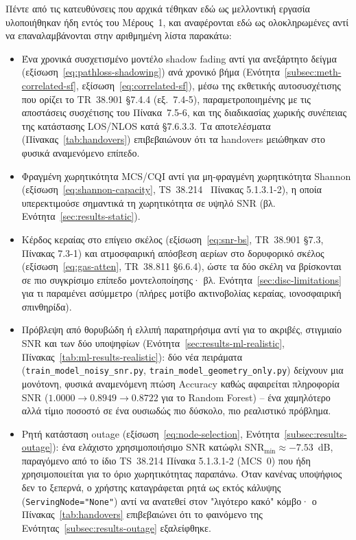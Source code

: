 Πέντε από τις κατευθύνσεις που αρχικά τέθηκαν εδώ ως μελλοντική
εργασία υλοποιήθηκαν ήδη εντός του Μέρους~1, και αναφέρονται εδώ ως
ολοκληρωμένες αντί να επαναλαμβάνονται στην αριθμημένη λίστα παρακάτω:

\begin{itemize}
  \item Ένα χρονικά συσχετισμένο μοντέλο shadow fading αντί για
    ανεξάρτητο δείγμα (εξίσωση~\eqref{eq:pathloss-shadowing}) ανά χρονικό
    βήμα (Ενότητα~\ref{subsec:meth-correlated-sf},
    εξίσωση~\eqref{eq:correlated-sf}), μέσω της εκθετικής αυτοσυσχέτισης
    που ορίζει το TR~38.901 §7.4.4 (εξ.~7.4-5), παραμετροποιημένης με τις
    αποστάσεις συσχέτισης του Πίνακα~7.5-6, και της διαδικασίας χωρικής
    συνέπειας της κατάστασης LOS/NLOS κατά §7.6.3.3. Τα
    αποτελέσματα (Πίνακας~\ref{tab:handovers}) επιβεβαιώνουν ότι τα
    handovers μειώθηκαν στο φυσικά αναμενόμενο επίπεδο.
  \item Φραγμένη χωρητικότητα MCS/CQI αντί για μη-φραγμένη χωρητικότητα
    Shannon (εξίσωση~\eqref{eq:shannon-capacity}, TS~38.214~\cite{ts38214}
    Πίνακας 5.1.3.1-2), η οποία υπερεκτιμούσε σημαντικά τη χωρητικότητα
    σε υψηλό SNR (βλ. Ενότητα~\ref{sec:results-static}).
  \item Κέρδος κεραίας στο επίγειο σκέλος (εξίσωση~\eqref{eq:snr-bs},
    TR~38.901 §7.3, Πίνακας 7.3-1) και ατμοσφαιρική απόσβεση αερίων στο
    δορυφορικό σκέλος (εξίσωση~\eqref{eq:gas-atten}, TR~38.811 §6.6.4),
    ώστε τα δύο σκέλη να βρίσκονται σε πιο συγκρίσιμο επίπεδο
    μοντελοποίησης· βλ. Ενότητα~\ref{sec:disc-limitations} για τι
    παραμένει ασύμμετρο (πλήρες μοτίβο ακτινοβολίας κεραίας, ιονοσφαιρική
    σπινθηρίδα).
  \item Πρόβλεψη από θορυβώδη ή ελλιπή παρατηρήσιμα αντί για το ακριβές,
    στιγμιαίο SNR και των δύο υποψηφίων (Ενότητα~\ref{sec:results-ml-realistic},
    Πίνακας~\ref{tab:ml-results-realistic}): δύο νέα πειράματα
    (\texttt{train\_model\_noisy\_snr.py}, \texttt{train\_model\_geometry\_only.py})
    δείχνουν μια μονότονη, φυσικά αναμενόμενη πτώση Accuracy καθώς
    αφαιρείται πληροφορία SNR ($1.0000 \rightarrow 0.8949 \rightarrow
    0.8722$ για το Random Forest) -- ένα χαμηλότερο αλλά τίμιο ποσοστό σε
    ένα ουσιωδώς πιο δύσκολο, πιο ρεαλιστικό πρόβλημα.
  \item Ρητή κατάσταση outage (εξίσωση~\eqref{eq:node-selection},
    Ενότητα~\ref{subsec:results-outage}): ένα ελάχιστο χρησιμοποιήσιμο SNR
    κατώφλι $\text{SNR}_{\min} \approx -7.53$~dB, παραγόμενο από το ίδιο
    TS~38.214 Πίνακα 5.1.3.1-2 (MCS~0) που ήδη χρησιμοποιείται για το όριο
    χωρητικότητας παραπάνω. Όταν κανένας υποψήφιος δεν το ξεπερνά, ο
    χρήστης καταγράφεται ρητά ως εκτός κάλυψης (\texttt{ServingNode="None"})
    αντί να ανατεθεί στον "λιγότερο κακό" κόμβο· ο Πίνακας~\ref{tab:handovers}
    επιβεβαιώνει ότι το φαινόμενο της Ενότητας~\ref{subsec:results-outage}
    εξαλείφθηκε.
\end{itemize}

